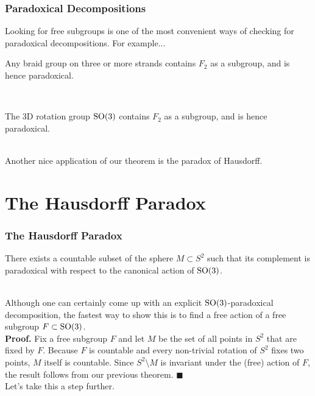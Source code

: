 \documentclass{beamer}
\theoremstyle{example}
\begin{document}
\begin{frame}
\frametitle{Paradoxical Decompositions}
Looking for free subgroups is one of the most convenient ways of checking for paradoxical decompositions. For example...\\[0.5\baselineskip]
\begin{example}
Any braid group on three or more strands contains $F_2$ as a subgroup, and is hence paradoxical.
\end{example}
\noindent\\[0.5\baselineskip]
\begin{example}
The 3D rotation group $\textup{SO}(3)$ contains $F_2$ as a subgroup, and is hence paradoxical.
\end{example}
\noindent\\[0.5\baselineskip] Another nice application of our theorem is the paradox of Hausdorff.
\end{frame}


\section{The Hausdorff Paradox}

\begin{frame}
\frametitle{The Hausdorff Paradox}
\begin{theorem}
There exists a countable subset of the sphere $M \subset S^2$ such that its complement is paradoxical with respect to the canonical action of $\textup{SO}(3)$.
\end{theorem}
\noindent\\[0.5\baselineskip] Although one can certainly come up with an explicit $\textup{SO}(3)$-paradoxical decomposition, the fastest way to show this is to find a free action of a free subgroup $F \subset \textup{SO}(3)$.\\[\baselineskip]

\textbf{Proof.} Fix a free subgroup $F$ and let $M$ be the set of all points in $S^2$ that are fixed by $F$. Because $F$ is countable and every non-trivial rotation of $S^2$ fixes two points, $M$ itself is countable. Since $S^2\setminus M$ is invariant under the (free) action of $F$, the result follows from our previous theorem. \hfill \ensuremath{\blacksquare}\\[\baselineskip]

Let's take this a step further.
\end{frame}
\end{document}
